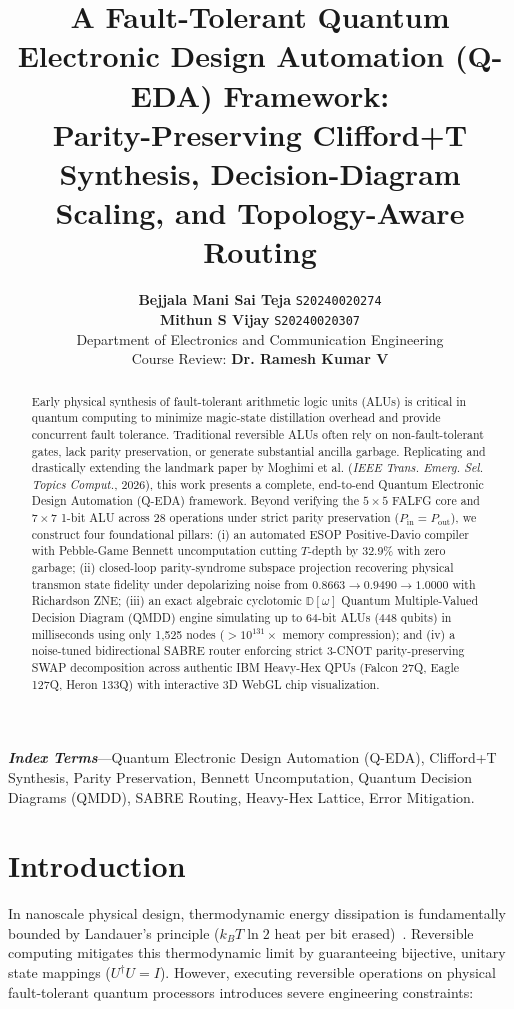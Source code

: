 \documentclass[10pt,twocolumn,letterpaper]{article}
\title{\Large\textbf{A Fault-Tolerant Quantum Electronic Design Automation (Q-EDA) Framework:\\Parity-Preserving Clifford+T Synthesis, Decision-Diagram Scaling, and Topology-Aware Routing}}
\author{
    \textbf{Bejjala Mani Sai Teja} \quad \texttt{S20240020274} \\
    \textbf{Mithun S Vijay} \quad \texttt{S20240020307} \\[2pt]
    Department of Electronics and Communication Engineering \\
    Course Review: \textbf{Dr. Ramesh Kumar V}
}
\date{}
\begin{document}
\maketitle

\begin{abstract}
Early physical synthesis of fault-tolerant arithmetic logic units (ALUs) is critical in quantum computing to minimize magic-state distillation overhead and provide concurrent fault tolerance. Traditional reversible ALUs often rely on non-fault-tolerant gates, lack parity preservation, or generate substantial ancilla garbage. Replicating and drastically extending the landmark paper by Moghimi et al. (\textit{IEEE Trans. Emerg. Sel. Topics Comput.}, 2026), this work presents a complete, end-to-end Quantum Electronic Design Automation (Q-EDA) framework. Beyond verifying the $5\times 5$ FALFG core and $7\times 7$ 1-bit ALU across 28 operations under strict parity preservation ($P_{\text{in}} = P_{\text{out}}$), we construct four foundational pillars: (i) an automated ESOP Positive-Davio compiler with Pebble-Game Bennett uncomputation cutting $T$-depth by 32.9\% with zero garbage; (ii) closed-loop parity-syndrome subspace projection recovering physical transmon state fidelity under depolarizing noise from $0.8663 \to 0.9490 \to 1.0000$ with Richardson ZNE; (iii) an exact algebraic cyclotomic $\mathbb{D}[\omega]$ Quantum Multiple-Valued Decision Diagram (QMDD) engine simulating up to 64-bit ALUs (448 qubits) in milliseconds using only 1,525 nodes ($>10^{131}\times$ memory compression); and (iv) a noise-tuned bidirectional SABRE router enforcing strict 3-CNOT parity-preserving SWAP decomposition across authentic IBM Heavy-Hex QPUs (Falcon 27Q, Eagle 127Q, Heron 133Q) with interactive 3D WebGL chip visualization.
\end{abstract}

\vspace{2pt}
\noindent\textbf{\textit{Index Terms}}---Quantum Electronic Design Automation (Q-EDA), Clifford+T Synthesis, Parity Preservation, Bennett Uncomputation, Quantum Decision Diagrams (QMDD), SABRE Routing, Heavy-Hex Lattice, Error Mitigation.

\section{Introduction}
In nanoscale physical design, thermodynamic energy dissipation is fundamentally bounded by Landauer's principle ($k_B T \ln 2$ heat per bit erased)~\cite{landauer1961}. Reversible computing mitigates this thermodynamic limit by guaranteeing bijective, unitary state mappings ($U^\dagger U = I$). However, executing reversible operations on physical fault-tolerant quantum processors introduces severe engineering constraints:
\end{document}
